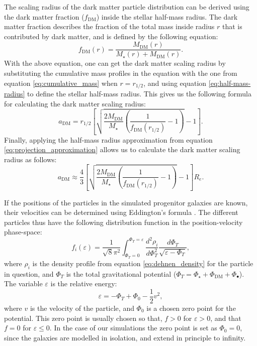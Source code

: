 \documentclass[english, oneside]{HYgradu}
\begin{document}
The scaling radius of the dark matter particle distribution can be derived using the dark matter fraction ($f_{\mathrm{DM}}$) inside the stellar half-mass radius. The dark matter fraction describes the fraction of the total mass inside radius $r$ that is contributed by dark matter, and is defined by the following equation:
\begin{equation}
f_\mathrm{DM}(r) = \frac{M_\mathrm{DM}(r)}{M_\star(r) + M_\mathrm{DM}(r)}. \label{eq:dm_fraction}
\end{equation}
With the above equation, one can get the dark matter scaling radius by substituting the cumulative mass profiles in the equation with the one from equation \ref{eq:cumulative_mass} when $r=r_{1/2}$, and using equation \ref{eq:half-mass-radius} to define the stellar half-mass radius. This gives us the following formula for calculating the dark matter scaling radius:
\begin{equation}
a_\mathrm{DM} =  r_\mathrm{1/2} \left[ \sqrt{\frac{2M_\mathrm{DM}}{M_\star} \left( \frac{1}{f_\mathrm{DM}(r_{1/2})} - 1 \right)} -1 \right].
\end{equation}
Finally, applying the half-mass radius approximation from equation \ref{eq:projection_approximation} allows us to calculate the dark matter scaling radius as follows:
\begin{equation}
a_\mathrm{DM} \approx \frac{4}{3} \left[ \sqrt{\frac{2M_\mathrm{DM}}{M_\star} \left( \frac{1}{f_\mathrm{DM}(r_{1/2})} - 1 \right)} -1 \right] R_e.
\end{equation}

If the positions of the particles in the simulated progenitor galaxies are known, their velocities can be determined using Eddington's formula \citep{BinneyTremaine}. The different particles thus have the following distribution function in the position-velocity phase-space:
\begin{equation}
f_i(\varepsilon) = \frac{1}{\sqrt{8}\pi^2} \int^{\Phi_T = \varepsilon}_{\Phi_T = 0} \frac{d^2\rho_i}{d\Phi^2_T}
\frac{d\Phi_T}{\sqrt{\varepsilon - \Phi_T}}, \label{eq:eddington_form}
\end{equation}
where $\rho_i$ is the density profile from equation \ref{eq:dehnen_density} for the particle in question, and $\Phi_T$ is the total gravitational potential ($\Phi_T = \Phi_\star + \Phi_\mathrm{DM} + \Phi_\bullet$). The variable $\varepsilon$ is the relative energy:
\begin{equation}
\varepsilon = -\Phi_T + \Phi_0 - \frac{1}{2} v^2,
\end{equation}
where $v$ is the velocity of the particle, and $\Phi_0$ is a chosen zero point for the potential. This zero point is usually chosen so that, $f > 0$ for $\varepsilon > 0$, and that $f = 0$ for $\varepsilon \leq 0$. In the case of our simulations the zero point is set as $\Phi_0 = 0$, since the galaxies are modelled in isolation, and extend in principle to infinity.
\end{document}
